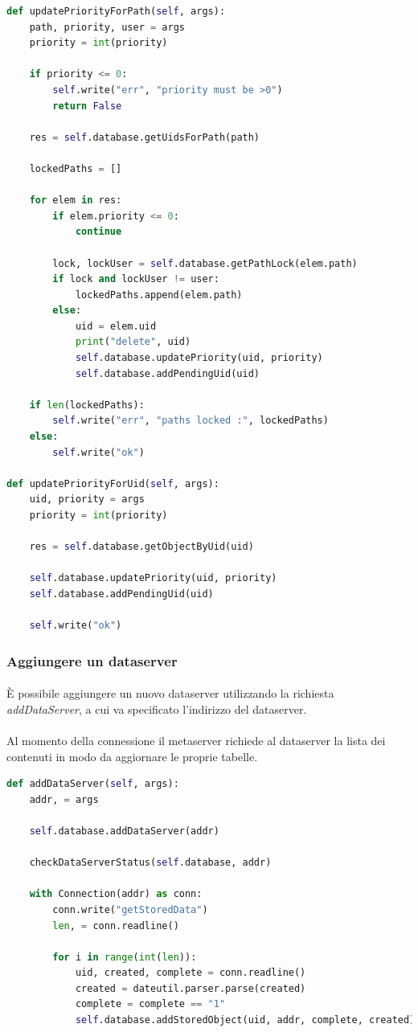 \documentclass{article}
\begin{document}
\begin{lstlisting}[language=Python, title=Metaserver]
def updatePriorityForPath(self, args):
    path, priority, user = args
    priority = int(priority)

    if priority <= 0:
        self.write("err", "priority must be >0")
        return False

    res = self.database.getUidsForPath(path)

    lockedPaths = []

    for elem in res:
        if elem.priority <= 0:
            continue

        lock, lockUser = self.database.getPathLock(elem.path)
        if lock and lockUser != user:
            lockedPaths.append(elem.path)
        else:
            uid = elem.uid
            print("delete", uid)
            self.database.updatePriority(uid, priority)
            self.database.addPendingUid(uid)

    if len(lockedPaths):
        self.write("err", "paths locked :", lockedPaths)
    else:
        self.write("ok")

def updatePriorityForUid(self, args):
    uid, priority = args
    priority = int(priority)

    res = self.database.getObjectByUid(uid)

    self.database.updatePriority(uid, priority)
    self.database.addPendingUid(uid)

    self.write("ok")
\end{lstlisting}

\subsubsection{Aggiungere un dataserver}

\paragraph{} È possibile aggiungere un nuovo dataserver utilizzando la richiesta \emph{addDataServer}, a cui va specificato l'indirizzo del dataserver. 

\paragraph{} Al momento della connessione il metaserver richiede al dataserver la lista dei contenuti in modo da aggiornare le proprie tabelle. 

\begin{lstlisting}[language=Python, title=Metaserver]
def addDataServer(self, args):
    addr, = args

    self.database.addDataServer(addr)

    checkDataServerStatus(self.database, addr)

    with Connection(addr) as conn:
        conn.write("getStoredData")
        len, = conn.readline()

        for i in range(int(len)):
            uid, created, complete = conn.readline()
            created = dateutil.parser.parse(created)
            complete = complete == "1"
            self.database.addStoredObject(uid, addr, complete, created)
\end{lstlisting}
\end{document}
